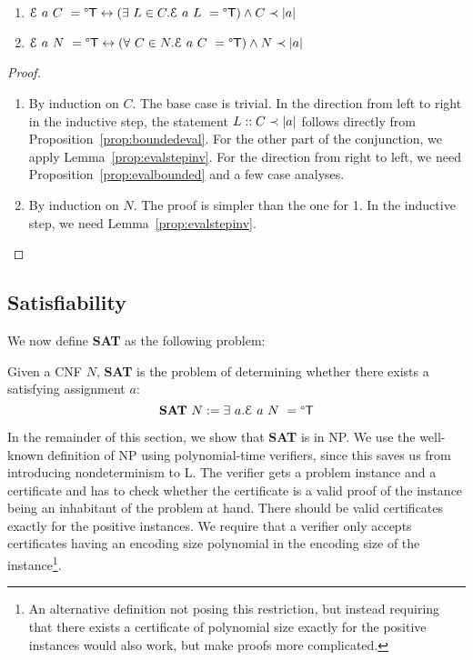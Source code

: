 \documentclass[a4paper,UKenglish,cleveref, autoref]{lipics-v2019}
\begin{document}
\begin{lemma}\label{prop:evalclauseiff}\leavevmode
  \begin{enumerate}
    \item
      $\mathcal{E}~a~C~ = \degree\mathsf{T} \leftrightarrow (\exists~L \in C. \mathcal{E}~a~L~ = \degree\mathsf{T}) \land C \prec |a|$
    \item 
      $\mathcal{E}~a~N~ = \degree\mathsf{T} \leftrightarrow (\forall~C \in N. \mathcal{E}~a~C~ = \degree\mathsf{T}) \land N \prec |a|$
  \end{enumerate}
\end{lemma}
\begin{proof}
  \begin{enumerate}
    \item By induction on $C$. The base case is trivial. In the direction from left to right in the inductive step, the statement $L::C \prec |a|$ follows directly from Proposition~\ref{prop:boundedeval}. For the other part of the conjunction, we apply Lemma~\ref{prop:evalstepinv}.
      For the direction from right to left, we need Proposition~\ref{prop:evalbounded} and a few case analyses.    
    \item By induction on $N$. The proof is simpler than the one for 1. In the inductive step, we need Lemma~\ref{prop:evalstepinv}.
  \end{enumerate}
\end{proof}

\subsection{Satisfiability}
We now define \textbf{SAT} as the following problem:
\begin{definition}
  Given a CNF $N$, \textbf{SAT} is the problem of determining whether there exists a satisfying assignment $a$:
  \[\textbf{SAT}~N := \exists~a. \mathcal{E}~a~N~ = \degree\mathsf{T} \]
\end{definition}

In the remainder of this section, we show that \textbf{SAT} is in NP. We use the well-known definition of NP using polynomial-time verifiers, since this saves us from introducing nondeterminism to L. 
The verifier gets a problem instance and a certificate and has to check whether the certificate is a valid proof of the instance being an inhabitant of the problem at hand. There should be valid certificates exactly for the positive instances. We require that a verifier only accepts certificates having an encoding size polynomial in the encoding size of the instance\footnote{An alternative definition not posing this restriction, but instead requiring that there exists a certificate of polynomial size exactly for the positive instances would also work, but make proofs more complicated.}.
\end{document}
